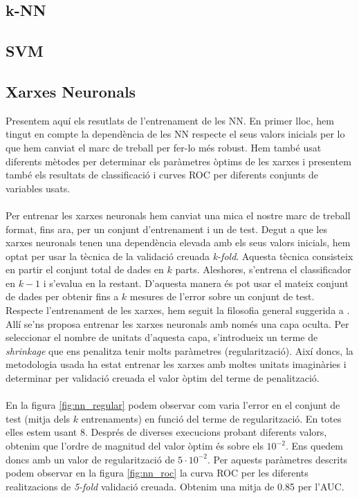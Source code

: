 \documentclass[a4paper,10pt]{article}
\begin{document}
\subsection{k-NN}
\subsection{SVM}

\subsection{Xarxes Neuronals}
Presentem aquí els resutlats de l'entrenament de les NN. En primer lloc, hem tingut en compte la dependència de les NN respecte el seus valors inicials per lo que hem canviat el marc de treball per fer-lo més robust. Hem també  usat diferents mètodes per determinar els paràmetres òptims de les xarxes i presentem també els resultats de classificació i curves ROC per diferents conjunts de variables usats.
\\
\\
Per entrenar les xarxes neuronals hem canviat una mica el nostre marc de treball format, fins ara, per un conjunt d'entrenament i un de test. Degut a que les xarxes neuronals tenen una dependència elevada amb els seus valors inicials, hem optat per usar la tècnica de la validació creuada \textit{k-fold}. Aquesta tècnica consisteix en partir el conjunt total de dades en $k$ parts. Aleshores, s'entrena el classificador en $k-1$ i s'evalua en la restant. D'aquesta manera és pot usar el mateix conjunt de dades per obtenir fins a $k$ mesures de l'error sobre un conjunt de test. Respecte l'entrenament de les xarxes, hem seguit la filosofia general suggerida a \cite{hastie09}. Allí se'ns proposa entrenar les xarxes neuronals amb només una capa oculta. Per seleccionar el nombre de unitats d'aquesta capa, s'introdueix un terme de \textit{shrinkage} que ens penalitza tenir molts paràmetres (regularització). Així doncs, la metodologia usada ha estat entrenar les xarxes amb moltes unitats imaginàries i determinar per validació creuada el valor òptim del terme de penalització. 
\\
\\
En la figura \ref{fig:nn_regular} podem observar com varia l'error en el conjunt de test (mitja dels $k$ entrenaments) en funció del terme de regularització. En totes elles estem usant 8. Després de diverses execucions probant diferents valors, obtenim que l'ordre de magnitud del valor òptim és sobre els $10^{-2}$. Ens quedem doncs amb un valor de regularització de $5\cdot 10^{-2}$. Per aquests paràmetres descrits podem observar en la figura \ref{fig:nn_roc} la curva ROC per les diferents realitzacions de \textit{5-fold} validació creuada. Obtenim una mitja de 0.85 per l'AUC.
\end{document}
